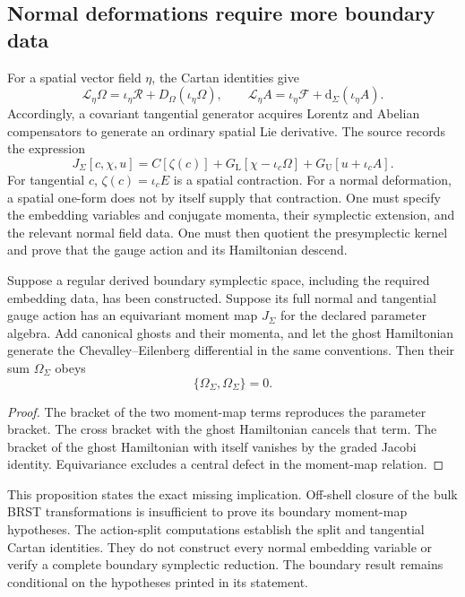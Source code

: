 \subsection{Normal deformations require more boundary data}
For a spatial vector field $\eta$, the Cartan identities give
\begin{equation}
 \mathcal L_\eta\Omega=\iota_\eta\mathcal R+D_\Omega(\iota_\eta\Omega),
 \qquad
 \mathcal L_\eta A=\iota_\eta\mathcal F+\mathrm d_\Sigma(\iota_\eta A).
\end{equation}
Accordingly, a covariant tangential generator acquires Lorentz and Abelian compensators to generate an ordinary spatial Lie derivative. The source records the expression
\begin{equation}
 J_\Sigma[c,\chi,u]=C[\zeta(c)]
             +G_{\mathrm L}[\chi-\iota_c\Omega]
             +G_{\mathrm U}[u+\iota_cA].
 \label{c:constraints:boundary-candidate}
\end{equation}
For tangential $c$, $\zeta(c)=\iota_cE$ is a spatial contraction. For a normal deformation, a spatial one-form does not by itself supply that contraction. One must specify the embedding variables and conjugate momenta, their symplectic extension, and the relevant normal field data. One must then quotient the presymplectic kernel and prove that the gauge action and its Hamiltonian descend.

\begin{proposition}
Suppose a regular derived boundary symplectic space, including the required embedding data, has been constructed. Suppose its full normal and tangential gauge action has an equivariant moment map $J_\Sigma$ for the declared parameter algebra. Add canonical ghosts and their momenta, and let the ghost Hamiltonian generate the Chevalley--Eilenberg differential in the same conventions. Then their sum $\Omega_\Sigma$ obeys
\begin{equation}
 \{\Omega_\Sigma,\Omega_\Sigma\}=0.
\end{equation}
\end{proposition}
\begin{proof}
The bracket of the two moment-map terms reproduces the parameter bracket. The cross bracket with the ghost Hamiltonian cancels that term. The bracket of the ghost Hamiltonian with itself vanishes by the graded Jacobi identity. Equivariance excludes a central defect in the moment-map relation.
\end{proof}

This proposition states the exact missing implication. Off-shell closure of the bulk BRST transformations is insufficient to prove its boundary moment-map hypotheses. The action-split computations establish the split and tangential Cartan identities. They do not construct every normal embedding variable or verify a complete boundary symplectic reduction. The boundary result remains conditional on the hypotheses printed in its statement.

